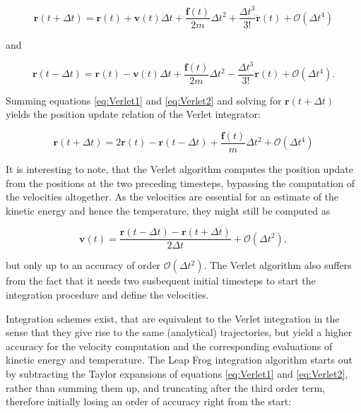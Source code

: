 \documentclass[english, a4paper, 12pt, titlepage, draft]{article}
\newcommand{\vect}[1]{\mathbf{#1}}
\newcommand{\fun}[2]{#1\left(#2\right)}
\newcommand{\vfun}[2]{\vect{#1}\left(#2\right)}
\begin{document}
\begin{equation}
    \vfun{r}{t+\Delta t} = \vfun{r}{t} + \vfun{v}{t}\Delta t + \frac{\vfun{f}{t}}{2m} \Delta t^2 + \frac{\Delta t^3}{3!} \vfun{\dddot r}{t} + \fun{\mathcal{O}}{\Delta t^4}
    \label{eq:Verlet1}
\end{equation}

and

\begin{equation}
    \vfun{r}{t-\Delta t} = \vfun{r}{t} - \vfun{v}{t}\Delta t + \frac{\vfun{f}{t}}{2m} \Delta t^2 - \frac{\Delta t^3}{3!} \vfun{\dddot r}{t} + \fun{\mathcal{O}}{\Delta t^4}.
    \label{eq:Verlet2}
\end{equation} 

Summing equations \ref{eq:Verlet1} and \ref{eq:Verlet2} and solving for $\vfun{r}{t+\Delta t}$ yields the position update relation of the Verlet integrator:

\begin{equation}
    \vfun{r}{t+\Delta t} = 2\vfun{r}{t} - \vfun{r}{t-\Delta t} + \frac{\vfun{f}{t}}{m} \Delta t^2 + \mathcal{O}(\Delta t^4)
    \label{eq:VerletPos}
\end{equation}

It is interesting to note, that the Verlet algorithm computes the position update from the positions at the two preceding timesteps, bypassing the computation of the velocities altogether.
As the velocities are essential for an estimate of the kinetic energy and hence the temperature, they might still be computed as

\begin{equation}
    \vfun{v}{t} = \frac{\vfun{r}{t-\Delta t} - \vfun{r}{t+\Delta t}}{2\Delta t} + \mathcal{O}(\Delta t^2),
\end{equation}

but only up to an accuracy of order $\mathcal{O}(\Delta t^2)$.
The Verlet algorithm also suffers from the fact that it needs two susbequent initial timesteps to start the integration procedure and define the velocities.

Integration schemes exist, that are equivalent to the Verlet integration in the sense that they give rise to the same (analytical) trajectories, but yield a higher accuracy for the velocity computation and the corresponding evaluations of kinetic energy and temperature.
The Leap Frog integration algorithm starts out by subtracting the Taylor expansions of equations \ref{eq:Verlet1} and \ref{eq:Verlet2}, rather than summing them up, and truncating after the third order term, therefore initially losing an order of accuracy right from the start:
\end{document}
